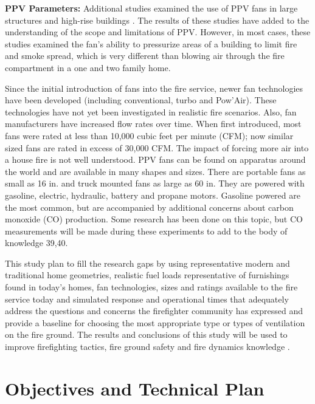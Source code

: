 \documentclass{article}
\begin{document}
\textbf{PPV Parameters:} \mbox{}Additional studies examined the use of PPV fans in large structures and high-rise buildings \cite{SymposiumHighRisePPV} \cite{KerberMadrzyPPVInLargeStructures} \cite{KerberMadrzyPPVInHighRise}. The results of these studies have added to the understanding of the scope and limitations of PPV. However, in most cases, these studies examined the fan’s ability to pressurize areas of a building to limit fire and smoke spread, which is very different than blowing air through the fire compartment in a one and two family home. 

Since the initial introduction of fans into the fire service, newer fan technologies have been developed (including conventional, turbo and Pow’Air). These technologies have not yet been investigated in realistic fire scenarios. Also, fan manufacturers have increased flow rates over time. When first introduced, most fans were rated at less than 10,000 cubic feet per minute (CFM); now similar sized fans are rated in excess of 30,000 CFM. The impact of forcing more air into a house fire is not well understood. PPV fans can be found on apparatus around the world and are available in many shapes and sizes. There are portable fans as small as 16 in. and truck mounted fans as large as 60 in. They are powered with gasoline, electric, hydraulic, battery and propane motors. Gasoline powered are the most common, but are accompanied by additional concerns about carbon monoxide (CO) production. Some research has been done on this topic, but CO measurements will be made during these experiments to add to the body of knowledge 39,40. 

This study plan to fill the research gaps by using representative modern and traditional home geometries, realistic fuel loads representative of furnishings found in today’s homes, fan technologies, sizes and ratings available to the fire service today and simulated response and operational times that adequately address the questions and concerns the firefighter community has expressed and provide a baseline for choosing the most appropriate type or types of ventilation on the fire ground. The results and conclusions of this study will be used to improve firefighting tactics, fire ground safety and fire dynamics knowledge \cite{KerberMadrzyPPVInHighRise} \cite{LougheedPPVHighRise}.

\clearpage

\section{Objectives and Technical Plan}
\end{document}
